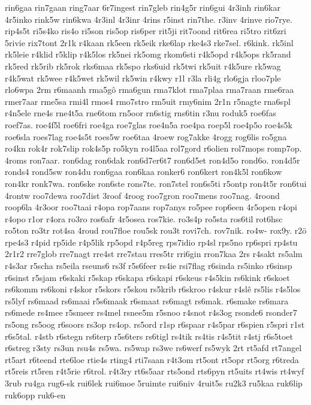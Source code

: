 rin6gaa
rin7gaan
ring7aar
6r7ingest
rin7gleb
rin4g5r
rin6gui
4r3inh
rin6kar
4r5inko
rink5w
rin6kwa
4r3inl
4r3inr
4rins
r5inst
rin7the.
r3inv
4rinve
rio7rye.
rip4s5t
ri5s4ko
ris4o
ri5son
ris5op
ris6per
rit5ji
rit7oond
rit6rea
ri5tro
rit6zri
5rivie
rix7tont
2r1k
r4kaan
rk5een
rk5eik
rke6lap
rke4s3
rke7sel.
r6kink.
rk5inl
rk5leie
r4klid
r5klip
r4k5los
rk5nei
rk5omg
rkom6sti
r4k5opd
r4k5ops
rk5rand
rk5red
rk5rib
rk5rok
rks6maa
rk5spo
rks6uid
rk5twi
rk5uit
r4k5ure
rk5wag
r4k5wat
rk5wee
r4k5wet
rk5wil
rk5win
r4kwy
r1l
r3la
rli4g
rlo6gja
rloo7ple
rlo6wpa
2rm
r6maanh
rma5gô
rma6gun
rma7klot
rma7plaa
rma7raan
rme6raa
rmer7aar
rme5sa
rmi4l
rmos4
rmo7stro
rm5uit
rmy6nim
2r1n
r5nagte
rna6spl
r4n5ele
rne4s
rne4t5a
rne6tom
rn5oor
rn6stig
rns6tin
r3nu
roduk5
roe6fas
roef7as.
roe4f5l
roe6fri
roe4ga
roe7glas
roe4n5a
roe4pa
roep5l
roe4p5o
roe4s5k
roe6sla
roes7lag
roe4s5t
roes5w
roe6taa
4roew
rog7akke
4rogg
rog6lis
ro5gna
ro4kn
rok4r
rok7slip
rok4s5p
ro5kyn
ro4l5aa
rol7gord
r6olien
rol7mops
romp7op.
4roms
ron7aar.
ron6dag
ron6dak
ron6d7er6t7
ron6d5et
ron4d5o
rond6o.
ron4d5r
ronds4
rond5sw
ron4du
ron6gaa
ron6kaa
ronker6
ron6kert
ron4k5l
ron6kow
ron4kr
ronk7wa.
ron6ske
ron6ste
rons7te.
ron7stel
ron6s5ti
r5ontp
ron4t5r
ron6tui
4rontw
roo7dewa
roo7dist
3roof
4roog
roo7gron
roo7mens
roo7nag.
4roond
roop6la
4r3oor
roo7taai
r4opa
rop7aans
rop7anys
ro5pee
rop6een
4r5open
r4opi
r4opo
r1or
r4ora
ro3ro
ros6afr
4r5osea
ros7kie.
ro3s4p
ro5sta
ros6til
rot6hsc
ro5ton
ro3tr
rot4sa
4roud
rou7floe
rou5sk
rou3t
rovi7ch.
rov7nik.
ro4w-
rox9y.
r2ö
rpe4s3
r4pid
rp5ide
r4p5lik
rp5opd
r4p5reg
rps7idio
rp4sl
rps5no
rp6spri
rp4stu
2r1r2
rre7glob
rre7nagt
rre4st
rre7stau
rres5tr
rri6gin
rron7kaa
2rs
r4sakt
rs5alm
r4s3ar
r5scha
rs5eila
rseuns6
rs3f
r5s6feer
rs4ie
rsi7flag
r6sinda
rs5inko
r6sinsp
r6sinst
r5sjam
r6skaki
r5skap
r6skapa
r6skapi
r6skeus
r4s5kin
rs6kink
r6skoet
rs6komm
rs6koni
r4skor
r5skors
r5skou
rs5krib
r6skroo
r4skur
r4slê
rs5lis
r4s5los
rs5lyf
rs6maad
rs6maai
r5s6maak
r6smaat
rs6magt
rs6mak.
r6smake
rs6mara
rs6mede
rs4mee
r5smeer
rs4mel
rsnee5m
r5snoo
r4snot
r4s3og
rsonde6
rsonder7
rs5ong
rs5oog
r6soors
rs3op
rs4op.
rs5ord
r1sp
r6spaar
r4s5par
r6spien
r5spri
r1st
r6s5tal.
r4stb
r6stegn
rs6terp
r5s6ters
rs6tigl
rs4tik
rs4tis
r4s5tit
r4stj
r6s5toet
r6streg
r3sty
rs3un
rsu4s
rs5wa.
rs5wap
rs3we
rs6werf
rs5wyk
2rt
rt5afd
rt7angel
rt5art
r6teend
rte6loe
rtie4s
rting4
rti7saan
r4t3om
rt5ont
rt5opr
rt5org
r6treda
rt5reis
rt5ren
r4t5rie
r6trol.
r4t3ry
rt6s5aar
rts5ond
rts6pyn
rt5uits
rt4wis
rt4wyf
3rub
ru4ga
rug6-sk
rui6lek
rui6moe
5ruimte
rui6niv
4ruit5s
ru2k3
ru5kaa
ruk6lip
ruk6opp
ruk6-en
